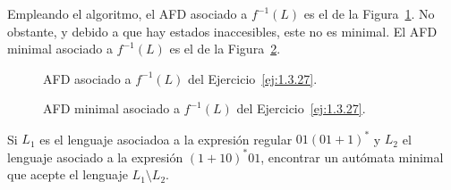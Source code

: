 \begin{ejercicio}
    Empleando el algoritmo, el AFD asociado a $f^{-1}(L)$ es el de la Figura~\ref{fig:1.3.27-f-1-L}.
    No obstante, y debido a que hay estados inaccesibles, este no es minimal. El AFD minimal asociado a $f^{-1}(L)$ es el de la Figura~\ref{fig:1.3.27-f-1-L-minimal}.
    \begin{figure}[H]
        \centering
        \caption{AFD asociado a $f^{-1}(L)$ del Ejercicio~\ref{ej:1.3.27}.}
        \label{fig:1.3.27-f-1-L}
    \end{figure}
    \begin{figure}[H]
        \centering
        \caption{AFD minimal asociado a $f^{-1}(L)$ del Ejercicio~\ref{ej:1.3.27}.}
        \label{fig:1.3.27-f-1-L-minimal}
    \end{figure}
\end{ejercicio}

\begin{ejercicio}\label{ej:1.3.28}
    Si $L_1$ es el lenguaje asociadoa a la expresión regular $01{(01+1)}^{\ast}$ y $L_2$ el lenguaje asociado a la expresión ${(1+10)}^{\ast}01$, encontrar un autómata minimal que acepte el lenguaje $L_1\setminus L_2$.
\end{ejercicio}

